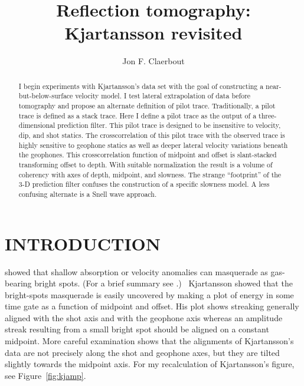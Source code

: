

\title{Reflection tomography:  Kjartansson revisited}

\author{Jon F. Claerbout}
\maketitle

\begin{abstract}
	I begin experiments with Kjartansson's data set with the
	goal of constructing a near-but-below-surface velocity model.
	I test lateral extrapolation of data before tomography
	and propose an alternate definition of pilot trace.
	Traditionally, a pilot trace is defined as a stack trace.
	Here I define a pilot trace as
	the output of a three-dimensional prediction filter.
	This pilot trace is designed to be
	insensitive to velocity, dip, and shot statics.
	The crosscorrelation of this pilot trace with the observed trace
	is highly sensitive to geophone statics
	as well as deeper lateral velocity variations beneath the geophones.
	This crosscorrelation function of midpoint and offset
	is slant-stacked transforming offset to depth.
	With suitable normalization the result is a volume
	of coherency with axes of depth, midpoint, and slowness.
	The strange ``footprint'' of the 3-D prediction filter
	confuses the construction of a specific slowness model.
	A less confusing alternate is a Snell wave approach.
\end{abstract}


\section{INTRODUCTION}
\cite{Kjartansson.sep.23}
showed that shallow absorption
or velocity anomalies can masquerade as gas-bearing bright spots.
(For a brief summary see \cite[]{Claerbout.blackwell.85}.)~
Kjartansson showed that the bright-spots masquerade is easily uncovered
by making a plot of energy in some time gate
as a function of midpoint and offset.
His plot shows streaking generally aligned
with the shot axis and with the geophone axis
whereas an amplitude streak resulting from a small bright spot should
be aligned on a constant midpoint.
More careful examination shows that
the alignments of Kjartansson's data
are not precisely along the shot and geophone axes,
but they are tilted slightly towards the midpoint axis.
For my recalculation of Kjartansson's figure, see
Figure~\ref{fig:kjamp}.

